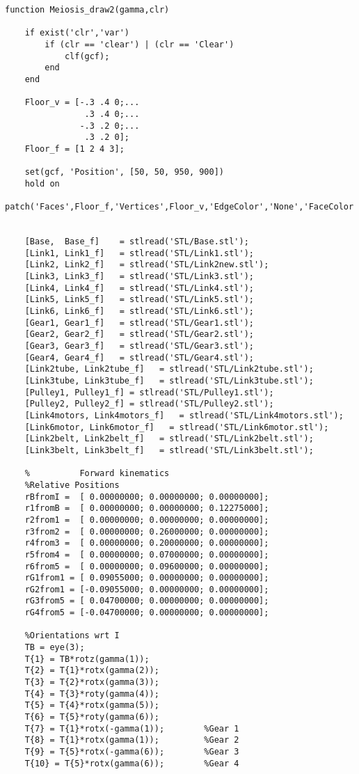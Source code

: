 \begin{lstlisting}[frame=lines,style=Matlab-editor,basicstyle = \mlttfamily, caption=MEIOSIS Drawing Function]
function Meiosis_draw2(gamma,clr)

    if exist('clr','var')
        if (clr == 'clear') | (clr == 'Clear')
            clf(gcf);
        end
    end

    Floor_v = [-.3 .4 0;...
                .3 .4 0;...
               -.3 .2 0;...
                .3 .2 0];
    Floor_f = [1 2 4 3];

    set(gcf, 'Position', [50, 50, 950, 900])
    hold on
    patch('Faces',Floor_f,'Vertices',Floor_v,'EdgeColor','None','FaceColor','white');%,'FaceAlpha',.5);


    [Base,  Base_f]    = stlread('STL/Base.stl');
    [Link1, Link1_f]   = stlread('STL/Link1.stl');
    [Link2, Link2_f]   = stlread('STL/Link2new.stl');
    [Link3, Link3_f]   = stlread('STL/Link3.stl');
    [Link4, Link4_f]   = stlread('STL/Link4.stl');
    [Link5, Link5_f]   = stlread('STL/Link5.stl');
    [Link6, Link6_f]   = stlread('STL/Link6.stl');
    [Gear1, Gear1_f]   = stlread('STL/Gear1.stl');
    [Gear2, Gear2_f]   = stlread('STL/Gear2.stl');
    [Gear3, Gear3_f]   = stlread('STL/Gear3.stl');
    [Gear4, Gear4_f]   = stlread('STL/Gear4.stl');
    [Link2tube, Link2tube_f]   = stlread('STL/Link2tube.stl');
    [Link3tube, Link3tube_f]   = stlread('STL/Link3tube.stl');
    [Pulley1, Pulley1_f] = stlread('STL/Pulley1.stl');
    [Pulley2, Pulley2_f] = stlread('STL/Pulley2.stl');
    [Link4motors, Link4motors_f]   = stlread('STL/Link4motors.stl');
    [Link6motor, Link6motor_f]   = stlread('STL/Link6motor.stl');
    [Link2belt, Link2belt_f]   = stlread('STL/Link2belt.stl');
    [Link3belt, Link3belt_f]   = stlread('STL/Link3belt.stl');

    %          Forward kinematics
    %Relative Positions
    rBfromI =  [ 0.00000000; 0.00000000; 0.00000000];
    r1fromB =  [ 0.00000000; 0.00000000; 0.12275000];
    r2from1 =  [ 0.00000000; 0.00000000; 0.00000000];
    r3from2 =  [ 0.00000000; 0.26000000; 0.00000000];
    r4from3 =  [ 0.00000000; 0.20000000; 0.00000000];
    r5from4 =  [ 0.00000000; 0.07000000; 0.00000000];
    r6from5 =  [ 0.00000000; 0.09600000; 0.00000000];
    rG1from1 = [ 0.09055000; 0.00000000; 0.00000000];
    rG2from1 = [-0.09055000; 0.00000000; 0.00000000];
    rG3from5 = [ 0.04700000; 0.00000000; 0.00000000];
    rG4from5 = [-0.04700000; 0.00000000; 0.00000000];

    %Orientations wrt I
    TB = eye(3);
    T{1} = TB*rotz(gamma(1));
    T{2} = T{1}*rotx(gamma(2));
    T{3} = T{2}*rotx(gamma(3));
    T{4} = T{3}*roty(gamma(4));
    T{5} = T{4}*rotx(gamma(5));
    T{6} = T{5}*roty(gamma(6));
    T{7} = T{1}*rotx(-gamma(1));        %Gear 1
    T{8} = T{1}*rotx(gamma(1));         %Gear 2
    T{9} = T{5}*rotx(-gamma(6));        %Gear 3
    T{10} = T{5}*rotx(gamma(6));        %Gear 4


\end{lstlisting}
